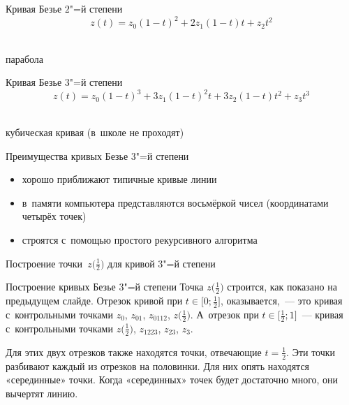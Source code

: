 \begin{frame}{Кривая Безье $2$"=й степени}
	\[
	z(t)=z_0(1-t)^2+2z_1(1-t)t+z_2t^2
	\]
\begin{center}
\\[4ex]
парабола
\end{center}
\end{frame}

\begin{frame}{Кривая Безье $3$"=й степени}
	\[
	z(t)=z_0(1-t)^3+3z_1(1-t)^2t+3z_2(1-t)t^2+z_3t^3
	\]
\begin{center}
\\[4ex]
кубическая кривая (в~школе не проходят)
\end{center}
\end{frame}

\begin{frame}{Преимущества кривых Безье $3$"=й степени}
\begin{itemize}
\item
хорошо приближают типичные кривые линии
\item
в~памяти компьютера представляются восьмёркой чисел (координатами четырёх
точек)
\item
строятся с~помощью простого рекурсивного алгоритма
\end{itemize}
\end{frame}

\begin{frame}{Построение точки~$z\bigl(\frac12\bigr)$ для кривой $3$"=й
степени}
\begin{center}
\end{center}
\end{frame}

\begin{frame}{Построение кривых Безье $3$"=й степени}
Точка $z\bigl(\frac12\bigr)$ строится, как показано на предыдущем слайде.
Отрезок кривой при $t\in\bigl[0;\frac12\bigr]$, оказывается,~— это кривая
с~контрольными точками $z_0$, $z_{01}$, $z_{0112}$, $z\bigl(\frac12\bigr)$.
А~отрезок при $t\in\bigl[\frac12;1\bigr]$~— кривая с~контрольными точками
$z\bigl(\frac12\bigr)$, $z_{1223}$, $z_{23}$, $z_3$.

Для этих двух отрезков также находятся точки, отвечающие $t=\frac12$. Эти точки
разбивают каждый из отрезков на половинки. Для них опять находятся «серединные»
точки. Когда «серединных» точек будет достаточно много, они вычертят линию.
\end{frame}

